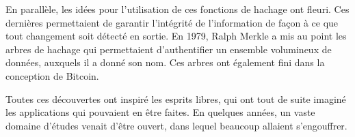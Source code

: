 En parallèle, les idées pour l'utilisation de ces fonctions de hachage ont fleuri. Ces dernières permettaient de garantir l'intégrité de l'information de façon à ce que tout changement soit détecté en sortie. En 1979, Ralph Merkle a mis au point les arbres de hachage qui permettaient d'authentifier un ensemble volumineux de données, auxquels il a donné son nom. Ces arbres ont également fini dans la conception de Bitcoin.


Toutes ces découvertes ont inspiré les esprits libres, qui ont tout de suite imaginé les applications qui pouvaient en être faites. En quelques années, un vaste domaine d'études venait d'être ouvert, dans lequel beaucoup allaient s'engouffrer.

